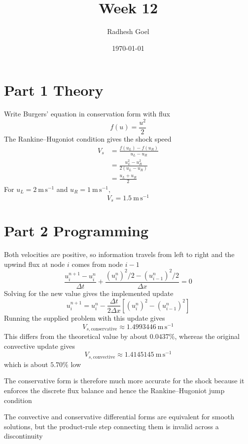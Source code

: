 \documentclass[a4paper]{exam}
\title{Week 12}
\author{Radhesh Goel}
\date{\today}
\begin{document}
\maketitle

\section*{Part 1 Theory}

\begin{solution}
  Write Burgers' equation in conservation form with flux
  \[
    f(u) = \frac{u^2}{2}
  \]
  The Rankine--Hugoniot condition gives the shock speed
  \[
    \begin{aligned}
      V_s & = \frac{f(u_L) - f(u_R)}{u_L - u_R}  \\
          & = \frac{u_L^2 - u_R^2}{2(u_L - u_R)} \\
          & = \frac{u_L + u_R}{2}
    \end{aligned}
  \]
  For \(u_L = 2\ \mathrm{m\,s^{-1}}\) and \(u_R = 1\ \mathrm{m\,s^{-1}}\),
  \[
    \boxed{V_s=1.5\ \mathrm{m\,s^{-1}}}
  \]
\end{solution}

\section*{Part 2 Programming}

\begin{solution}
  Both velocities are positive, so information travels from left to right and
  the upwind flux at node \(i\) comes from node \(i - 1\)
  \[
    \frac{u_i^{n+1} - u_i^n}{\Delta t} + \frac{(u_i^n)^2/2 - (u_{i-1}^n)^2/2}{\Delta x} = 0
  \]
  Solving for the new value gives the implemented update
  \[
    \boxed{
      u_i^{n+1}=u_i^n-
      \frac{\Delta t}{2\Delta x}
      \left[(u_i^n)^2-(u_{i-1}^n)^2\right]
    }
  \]
  Running the supplied problem with this update gives
  \[
    V_{s,\mathrm{conservative}} \approx 1.4993446\ \mathrm{m\,s^{-1}}
  \]
  This differs from the theoretical value by about \(0.0437\%\), whereas the
  original convective update gives
  \[
    V_{s,\mathrm{convective}} \approx 1.4145145\ \mathrm{m\,s^{-1}}
  \]
  which is about \(5.70\%\) low

  The conservative form is therefore much more accurate for the shock because it
  enforces the discrete flux balance and hence the Rankine--Hugoniot jump
  condition

  The convective and conservative differential forms are equivalent for smooth
  solutions, but the product-rule step connecting them is invalid across a
  discontinuity
\end{solution}
\end{document}
